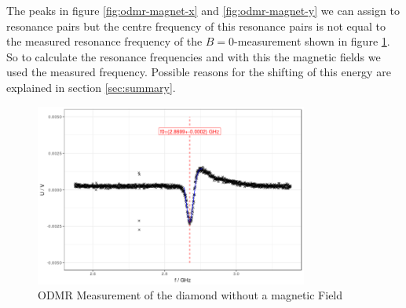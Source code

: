 The peaks in figure \ref{fig:odmr-magnet-x} and \ref{fig:odmr-magnet-y} we can assign to resonance pairs but the centre frequency of this resonance pairs is not equal to the measured resonance frequency of the $B=0$-measurement shown in figure \ref{fig:odmr-no-B}. So to calculate the resonance frequencies and with this the magnetic fields we used the measured frequency. Possible reasons for the shifting of this energy are explained in section \ref{sec:summary}.

\begin{figure}
	\centering
	\includegraphics[width=0.8\textwidth]{../figures/odmr-1.png}
	\caption{ODMR Measurement of the diamond without a magnetic Field}
	\label{fig:odmr-no-B}
\end{figure}


